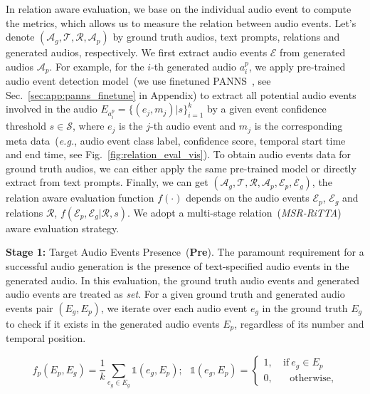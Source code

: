 In relation aware evaluation, we base on the individual audio event to compute the metrics, which allows us to measure the relation between audio events. Let's denote $(\mathcal{A}_g, \mathcal{T}, \mathcal{R}, \mathcal{A}_p)$ by ground truth audios, text prompts, relations and generated audios, respectively. We first extract audio events $\mathcal{E}$ from generated audios $\mathcal{A}_p$. For example, for the $i$-th generated audio $a_i^p$, we apply pre-trained audio event detection model~(we use finetuned PANNS~\citep{panns}, see Sec.~\ref{sec:app:panns_finetune} in Appendix) to extract all potential audio events involved in the audio $E_{a_i^p}=\{(e_j, m_j)|s\}_{i=1}^{k}$ by a given event confidence threshold $s\in \mathcal{S}$, where $e_j$ is the $j$-th audio event and $m_j$ is the corresponding meta data~(\textit{e.g.}, audio event class label, confidence score, temporal start time and end time, see Fig.~\ref{fig:relation_eval_vis}). To obtain audio events data for ground truth audios, we can either apply the same pre-trained model or directly extract from text prompts. Finally, we can get $(\mathcal{A}_g, \mathcal{T}, \mathcal{R}, \mathcal{A}_p, \mathcal{E}_p, \mathcal{E}_g)$, the relation aware evaluation function $f(\cdot)$ depends on the audio events $\mathcal{E}_p$, $\mathcal{E}_g$ and relations $\mathcal{R}$, $f(\mathcal{E}_p, \mathcal{E}_g|\mathcal{R}, s)$. We adopt a multi-stage relation~(\emph{MSR-RiTTA}) aware evaluation strategy.

\textbf{Stage 1:} Target Audio Events Presence~(\textbf{Pre}). The paramount requirement for a successful audio generation is the presence of text-specified audio events in the generated audio. In this evaluation, the ground truth audio events and generated audio events are treated as \textit{set}. For a given ground truth and generated audio events pair $(E_g, E_p)$, we iterate over each audio event $e_g$ in the ground truth $E_g$ to check if it exists in the generated audio events $E_p$, regardless of its number and temporal position. 

\begin{equation}
    f_p(E_p, E_g) = \frac{1}{k}\sum_{e_g \in E_{g}}\mathds{1} (e_{g}, E_{p});\ \ \ 
    \mathds{1}(e_g, E_p) = \left\{
    \begin{aligned}
        1,&\ \text{if}\ e_g \in E_p  \\
        0,& \ \ \ \ \text{otherwise},
    \end{aligned}
    \right.
\label{eqn:eval_presence}
\end{equation}

